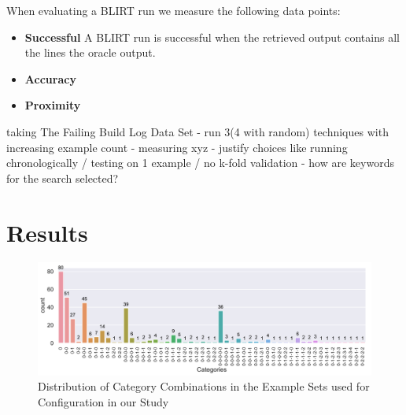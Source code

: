 \documentclass[\myrootdir/main.tex]{subfiles}
\begin{document}
When evaluating a BLIRT run we measure the following data points:
\begin{itemize}
	\item \textbf{Successful} A BLIRT run is successful when the retrieved output contains all the lines the oracle output.
	\item \textbf{Accuracy} 
	\item \textbf{Proximity} 
\end{itemize}

taking The Failing Build Log Data Set - run 3(4 with random) techniques with increasing example count - measuring xyz - justify choices like running chronologically / testing on 1 example / no k-fold validation - how are keywords for the search selected?

\section{Results}

\begin{figure}[htbp]
	\centering
	\includegraphics[width=\textwidth, clip]{img/big-study/categories-dataset.pdf}
	\caption{Distribution of Category Combinations in the Example Sets used for Configuration in our Study}
	\label{fig:categories-dataset}
\end{figure}
\end{document}
